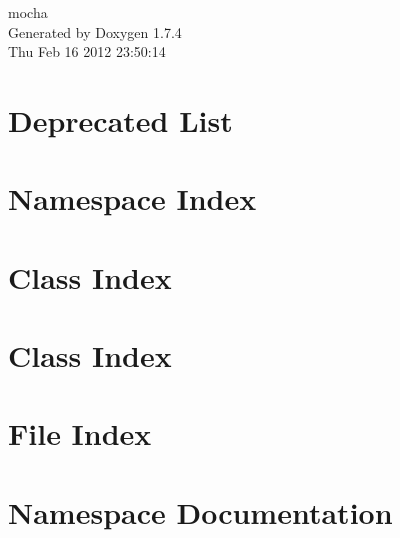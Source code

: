 \documentclass[a4paper]{book}
\begin{document}
\hypersetup{pageanchor=false}
\begin{titlepage}
\vspace*{7cm}
\begin{center}
{\Large mocha }\\
\vspace*{1cm}
{\large Generated by Doxygen 1.7.4}\\
\vspace*{0.5cm}
{\small Thu Feb 16 2012 23:50:14}\\
\end{center}
\end{titlepage}
\clearemptydoublepage
{}
\tableofcontents
\clearemptydoublepage
{}
\hypersetup{pageanchor=true}
\chapter{Deprecated List}
\label{deprecated}
\hypertarget{deprecated}{}

\chapter{Namespace Index}

\chapter{Class Index}

\chapter{Class Index}

\chapter{File Index}

\chapter{Namespace Documentation}








\end{document}
